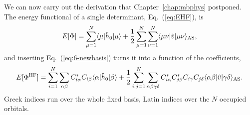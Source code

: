 We can now carry out the derivation that Chapter~\ref{chap:mbphys} postponed.
The energy functional of a single determinant, Eq.~(\ref{eq:EHF}), is
\begin{equation}
  E[\Phi] = \sum_{\mu=1}^{N}\langle \mu | \hat{h}_0 | \mu \rangle
    + \frac{1}{2}\sum_{\mu=1}^{N}\sum_{\nu=1}^{N}
      \langle\mu\nu\vert\hat{v}\vert\mu\nu\rangle_{\mathrm{AS}} ,
  \label{eq:6-energyfunctional}
\end{equation}
and inserting Eq.~(\ref{eq:6-newbasis}) turns it into a function of the
coefficients,
\begin{equation}
  E[\Phi^{\mathrm{HF}}]
  = \sum_{i=1}^{N}\sum_{\alpha\beta}C^{*}_{i\alpha}C_{i\beta}
      \langle \alpha | \hat{h}_0 | \beta \rangle
  + \frac{1}{2}\sum_{i,j=1}^{N}\sum_{\alpha\beta\gamma\delta}
      C^{*}_{i\alpha}C^{*}_{j\beta}C_{i\gamma}C_{j\delta}
      \langle\alpha\beta\vert\hat{v}\vert\gamma\delta\rangle_{\mathrm{AS}} .
  \label{eq:6-Efunctional}
\end{equation}
Greek indices run over the whole fixed basis, Latin indices over the $N$
occupied orbitals.

